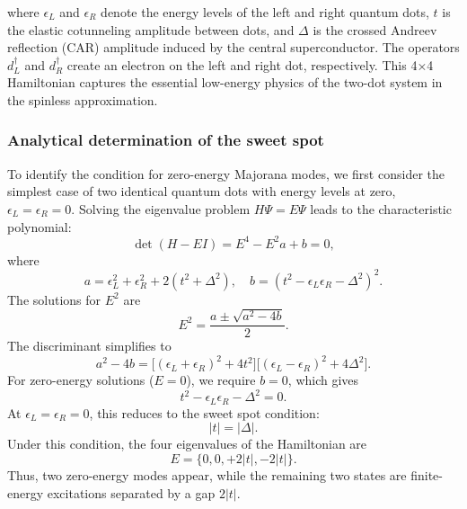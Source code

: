 \documentclass[11pt, letterpaper, titlepage]{article}
\begin{document}
where $\epsilon_L$ and $\epsilon_R$ denote the energy levels of the left and right quantum dots, $t$ is the elastic cotunneling amplitude between dots, and $\Delta$ is the crossed Andreev reflection (CAR) amplitude induced by the central superconductor. The operators $d_L^\dagger$ and $d_R^\dagger$ create an electron on the left and right dot, respectively. This 4×4 Hamiltonian captures the essential low-energy physics of the two-dot system in the spinless approximation. \cite{Qtech}

\subsubsection{Analytical determination of the sweet spot}
To identify the condition for zero-energy Majorana modes, we first consider the simplest case of two identical quantum dots with energy levels at zero, \(\epsilon_L = \epsilon_R = 0\). Solving the eigenvalue problem \(H \Psi = E \Psi\) leads to the characteristic polynomial:
\[
\det(H - E I) = E^4 - E^2 a + b = 0,
\]
where
\[
a = \epsilon_L^2 + \epsilon_R^2 + 2(t^2 + \Delta^2), \quad
b = (t^2 - \epsilon_L \epsilon_R - \Delta^2)^2.
\]
The solutions for \(E^2\) are
\[
E^2 = \frac{a \pm \sqrt{a^2 - 4b}}{2}.
\]
The discriminant simplifies to 
\[
a^2 - 4b = \big[(\epsilon_L + \epsilon_R)^2 + 4t^2\big] \big[(\epsilon_L - \epsilon_R)^2 + 4\Delta^2\big].
\]
For zero-energy solutions (\(E = 0\)), we require \(b = 0\), which gives
\[
t^2 - \epsilon_L \epsilon_R - \Delta^2 = 0.
\]
At \(\epsilon_L = \epsilon_R = 0\), this reduces to the sweet spot condition:
\[
|t| = |\Delta|.
\]
Under this condition, the four eigenvalues of the Hamiltonian are
\[
E = \{0, 0, +2|t|, -2|t|\}.
\]
Thus, two zero-energy modes appear, while the remaining two states are finite-energy excitations separated by a gap \(2|t|\).
\end{document}
